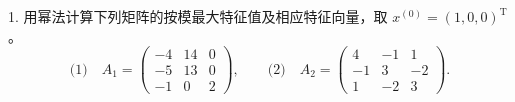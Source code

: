 \documentclass[11pt, a4paper]{ctexart}
\begin{document}
\begin{problem}{1. 用幂法计算下列矩阵的按模最大特征值及相应特征向量，取 $x^{(0)}=(1,0,0)^{\mathrm{T}}$。}
    \[
        \text{(1)}\quad
        A_1 =
        \begin{pmatrix}
            -4 & 14 & 0 \\
            -5 & 13 & 0 \\
            -1 & 0 & 2
        \end{pmatrix},
        \qquad
        \text{(2)}\quad
        A_2 =
        \begin{pmatrix}
            4 & -1 & 1 \\
            -1 & 3 & -2 \\
            1 & -2 & 3
        \end{pmatrix}.
    \]
\end{problem}
\end{document}
